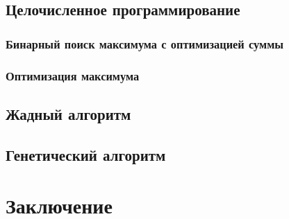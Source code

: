 \documentclass[a4paper,14pt,russian]{article}
\begin{document}
\subsection{Целочисленное программирование}
\subsubsection{Бинарный поиск максимума с оптимизацией суммы}
\subsubsection{Оптимизация максимума}
\subsection{Жадный алгоритм}
\subsection{Генетический алгоритм}

\section{Заключение}

\pagebreak



\end{document}
